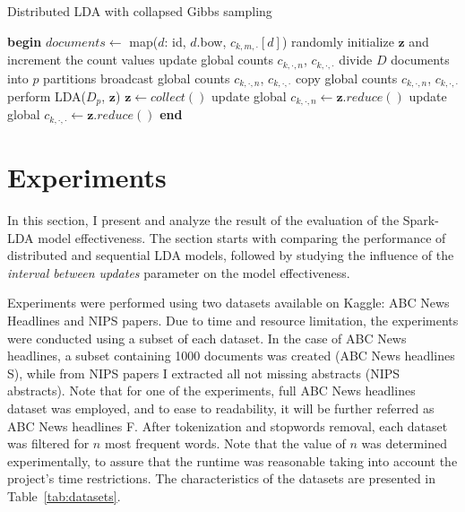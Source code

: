 \documentclass[journal]{IEEEtran}
\begin{document}
 \begin{algorithm}
\caption{Distributed LDA with collapsed Gibbs sampling}
\label{alg2}
\begin{algorithmic}
\scriptsize
\State \textbf{begin}
\State $documents \leftarrow $ map($d$: id, $d$.bow, $c_{k,m,\cdot}[d]$)
\State randomly initialize $\textbf{z}$ and increment the count values
\State update global counts $c_{k,\cdot,n}$, $c_{k,\cdot,\cdot}$
\State divide $D$ documents into $p$ partitions
   \State broadcast global counts $c_{k,\cdot,n}$, $c_{k,\cdot,\cdot}$
   	  \State copy global counts $c_{k,\cdot,n}$, $c_{k,\cdot,\cdot}$
   	  \State perform LDA($D_p$, $\textbf{z}$)
   \EndFor
   \State $\textbf{z} \leftarrow collect()$
   \State update global $c_{k,\cdot,n} \leftarrow\textbf{z}.reduce()$
   \State update global $c_{k,\cdot,\cdot} \leftarrow\textbf{z}.reduce()$
  \EndFor
\State \textbf{end}
\end{algorithmic}
\end{algorithm}


\section{Experiments}
\label{sec:exp}
In this section, I present and analyze the result of the evaluation of the Spark-LDA model effectiveness. The section starts with comparing the performance of distributed and sequential LDA models, followed by studying the influence of the \textit{interval between updates} parameter on the model effectiveness.

Experiments were performed using two datasets available on Kaggle: ABC News Headlines and NIPS papers. Due to time and resource limitation, the experiments were  conducted using a subset of each dataset. In the case of ABC News headlines, a subset containing 1000 documents was created (ABC News headlines S), while from NIPS papers I extracted all not missing abstracts (NIPS abstracts). Note that for one of the experiments, full ABC News headlines dataset was employed, and to ease to readability, it will be further referred as ABC News headlines F. After tokenization and stopwords removal, each dataset was filtered for $n$ most frequent words. Note that the value of $n$ was determined experimentally, to assure that the runtime was reasonable taking into account the project's time restrictions. The characteristics of the datasets are presented in Table~\ref{tab:datasets}.
\end{document}
